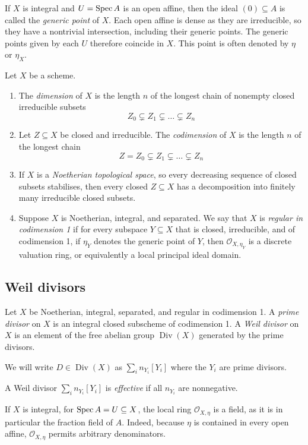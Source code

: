 If \( X \) is integral and \( U = \operatorname{Spec} A \) is an open affine, then the ideal \( (0) \subseteq A \) is called the \emph{generic point} of \( X \).
Each open affine is dense as they are irreducible, so they have a nontrivial intersection, including their generic points.
The generic points given by each \( U \) therefore coincide in \( X \).
This point is often denoted by \( \eta \) or \( \eta_X \).
\begin{definition}
    Let \( X \) be a scheme.
    \begin{enumerate}
        \item The \emph{dimension} of \( X \) is the length \( n \) of the longest chain of nonempty closed irreducible subsets
        \[ Z_0 \subsetneq Z_1 \subsetneq \dots \subsetneq Z_n \]
        \item Let \( Z \subseteq X \) be closed and irreducible.
        The \emph{codimension} of \( X \) is the length \( n \) of the longest chain
        \[ Z = Z_0 \subsetneq Z_1 \subsetneq \dots \subsetneq Z_n \]
        \item If \( X \) is a \emph{Noetherian topological space}, so every decreasing sequence of closed subsets stabilises, then every closed \( Z \subseteq X \) has a decomposition into finitely many irreducible closed subsets.
        \item Suppose \( X \) is Noetherian, integral, and separated.
        We say that \( X \) is \emph{regular in codimension 1} if for every subspace \( Y \subseteq X \) that is closed, irreducible, and of codimension 1, if \( \eta_Y \) denotes the generic point of \( Y \), then \( \mathcal O_{X, \eta_Y} \) is a discrete valuation ring, or equivalently a local principal ideal domain.
    \end{enumerate}
\end{definition}

\subsection{Weil divisors}
\begin{definition}
    Let \( X \) be Noetherian, integral, separated, and regular in codimension 1.
    A \emph{prime divisor} on \( X \) is an integral closed subscheme of codimension 1.
    A \emph{Weil divisor} on \( X \) is an element of the free abelian group \( \operatorname{Div}(X) \) generated by the prime divisors.
\end{definition}
We will write \( D \in \operatorname{Div}(X) \) as \( \sum_i n_{Y_i} [Y_i] \) where the \( Y_i \) are prime divisors.
\begin{definition}
    A Weil divisor \( \sum_i n_{Y_i} [Y_i] \) is \emph{effective} if all \( n_{Y_i} \) are nonnegative.
\end{definition}
If \( X \) is integral, for \( \operatorname{Spec} A = U \subseteq X \), the local ring \( \mathcal O_{X, \eta} \) is a field, as it is in particular the fraction field of \( A \).
Indeed, because \( \eta \) is contained in every open affine, \( \mathcal O_{X, \eta} \) permits arbitrary denominators.

